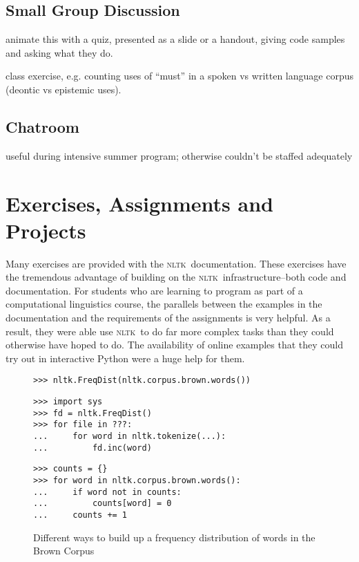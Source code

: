 \documentclass[11pt]{article}
\newcommand{\NLTK}{\textsc{nltk}}
\begin{document}
\subsection{Small Group Discussion}

animate this with a quiz, presented as a slide or a handout, giving code samples and asking what they do.

class exercise, e.g. counting uses of ``must'' in a spoken vs written language corpus
(deontic vs epistemic uses).

\subsection{Chatroom}

useful during intensive summer program; otherwise couldn't be staffed adequately

\section{Exercises, Assignments and Projects}
\label{sec:projects}

Many exercises are provided with the \NLTK\ documentation. These
exercises have the tremendous advantage of building on the \NLTK\
infrastructure--both code and documentation. For students who are
learning to program as part of a computational linguistics course, the
parallels between the examples in the documentation and the
requirements of the assignments is very helpful. As a result, they
were able use \NLTK\ to do far more complex tasks than they could
otherwise have hoped to do. The availability of online examples that
they could try out in interactive Python were a huge help for them.


\begin{figure*}
{\small
\begin{verbatim}
>>> nltk.FreqDist(nltk.corpus.brown.words())
\end{verbatim}}

{\small
\begin{verbatim}
>>> import sys
>>> fd = nltk.FreqDist()
>>> for file in ???:
...     for word in nltk.tokenize(...):
...         fd.inc(word)
\end{verbatim}}

{\small
\begin{verbatim}
>>> counts = {}
>>> for word in nltk.corpus.brown.words():
...     if word not in counts:
...         counts[word] = 0
...     counts += 1
\end{verbatim}}
\caption{Different ways to build up a frequency distribution of words in the Brown Corpus}
\label{fig:freqdist}
\end{figure*}
\end{document}
